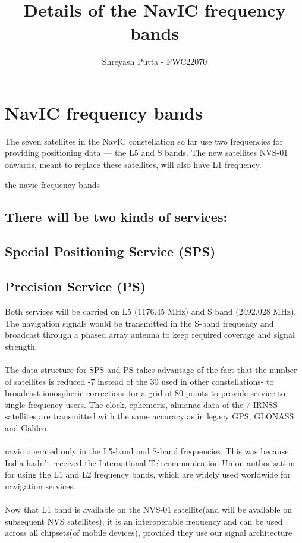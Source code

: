 \documentclass{article}
\begin{document}
\title{Details of the NavIC frequency bands }
\author{\Large Shreyash Putta - FWC22070}
\date{}

\maketitle

\section{NavIC frequency bands}
		The seven satellites in the NavIC constellation so far use two frequencies for providing positioning data — the L5 and S bands. The new satellites NVS-01 onwards, meant to replace these satellites, will also have L1 frequency.
		
	\begin{table}[h!]
	\small
	\centering
	\caption{the navic frequency bands}
	\label{bands}
	
	\end{table}

\subsection*{There will be two kinds of services:}
		

		\subsection{Special Positioning Service (SPS)}
		\subsection{Precision Service (PS)}
Both services will be carried on L5 (1176.45 MHz) and S band (2492.028 MHz). The navigation signals would be transmitted in the S-band frequency and broadcast through a phased array antenna to keep required coverage and signal strength.
\\
\\
The data structure for SPS and PS takes advantage of the fact that the number of satellites is reduced -7 instead of the 30 used in other constellations- to broadcast ionospheric corrections for a grid of 80 points to provide service to single frequency users. The clock, ephemeris, almanac data of the 7 IRNSS satellites are transmitted with the same accuracy as in legacy GPS, GLONASS and Galileo.
\\
\\
navic operated only in the L5-band and S-band frequencies. This was because India hadn't received the International Telecommunication Union authorisation for using the L1 and L2 frequency bands, which are widely used worldwide for navigation services.
\\
\\
Now that L1 band is available on the NVS-01 satellite(and will be available on subsequent NVS satellites), it is an interoperable frequency and can be used across all chipsets(of mobile devices), provided they use our signal architecture
\end{document}
